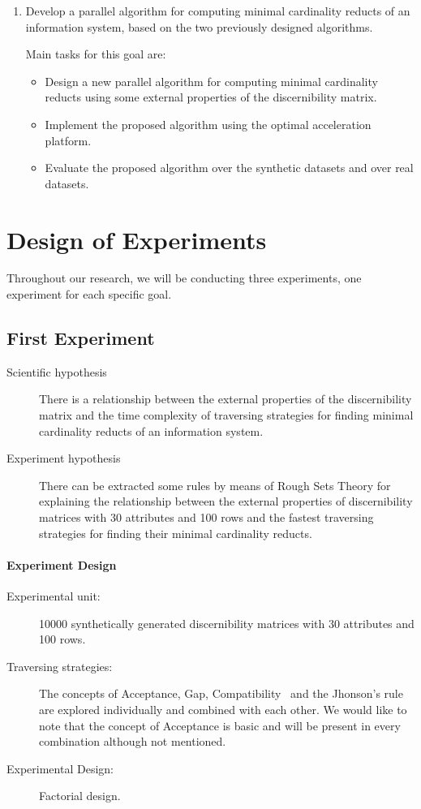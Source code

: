\documentclass[11pt]{article}   %
\begin{document}
\begin{enumerate}
  \item Develop a parallel algorithm for computing minimal cardinality reducts of an information system, based 
  		on the two previously designed algorithms.
  		
  		Main tasks for this goal are:
  		\begin{itemize}
  		\item Design a new parallel algorithm for computing minimal cardinality reducts using some external
  		      properties of the discernibility matrix.
  		\item Implement the proposed algorithm using the optimal acceleration platform.
  		\item Evaluate the proposed algorithm over the synthetic datasets and over real datasets.
  		\end{itemize}
  \end{enumerate}

\section{Design of Experiments}\label{DOE}
  Throughout our research, we will be conducting three experiments, one experiment for each specific goal.
  
\subsection{First Experiment}
  \begin{description}
  \item[Scientific hypothesis] There is a relationship between the external properties of the discernibility 
  							   matrix and the time complexity of traversing strategies for finding minimal
  							   cardinality reducts of an information	system.
  \item[Experiment hypothesis] There can be extracted some rules by means of Rough Sets Theory for explaining
  							   the relationship between the external properties of discernibility matrices
  							   with 30 attributes and 100 rows and the fastest traversing strategies for finding
  							   their minimal cardinality reducts.  
  \end{description}
  \paragraph{Experiment Design} 
	  \begin{description}
	  	\item[Experimental unit:] 10000 synthetically generated discernibility matrices with 30 attributes and
	  							  100 rows.
	  	\item[Traversing strategies:] The concepts of Acceptance, Gap, Compatibility~\cite{Lias13} and the 
	  								  Jhonson's rule~\cite{Ohrn00} are explored individually and combined with 
	  								  each other. We would like to note that the concept of Acceptance is basic
	  								  and will be present in every combination although not mentioned.
	  	\item[Experimental Design:] Factorial design.
	  \end{description}
\end{document}
